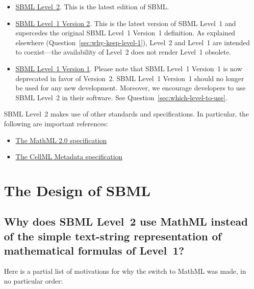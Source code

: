 \documentclass{sbmlfaq}
\begin{document}
\begin{itemize}
  
\item \href{http://www.sbw-sbml.org/sbml/docs/index.html}{SBML Level~2}.
  This is the latest edition of SBML.
  
\item \href{http://www.sbw-sbml.org/sbml/docs/index.html}{SBML Level~1
    Version 2}.  This is the latest version of SBML Level~1 and supercedes
  the original SBML Level~1 Version~1 definition.  As explained elsewhere
  (Question~\ref{sec:why-keep-level-1}), Level~2 and Level~1 are intended to
  coexist---the availability of Level~2 does not render Level~1 obsolete.
  
\item \href{http://www.sbw-sbml.org/sbml/docs/index.html}{SBML Level~1
    Version 1}.  Please note that SBML Level~1 Version~1 is now deprecated
  in favor of Version~2.  SBML Level~1 Version~1 should no longer be used
  for any new development.  Moreover, we encourage developers to use SBML
  Level~2 in their software.  See Question~\ref{sec:which-level-to-use}.

\end{itemize}

SBML Level~2 makes use of other standards and specifications.  In
particular, the following are important references:

\begin{itemize}

\item \href{http://www.w3.org/TR/2003/WD-MathML2-20030411/}{The MathML 2.0 specification}

\item \href{http://www.cellml.org/public/metadata/}{The CellML Metadata specification}

\end{itemize}


\section{The Design of SBML}

\subsection{Why does SBML Level~2 use MathML instead of the simple
  text-string representation of mathematical formulas of Level~1?}

Here is a partial list of motivations for why the switch to
MathML was made, in no particular order:
\end{document}
